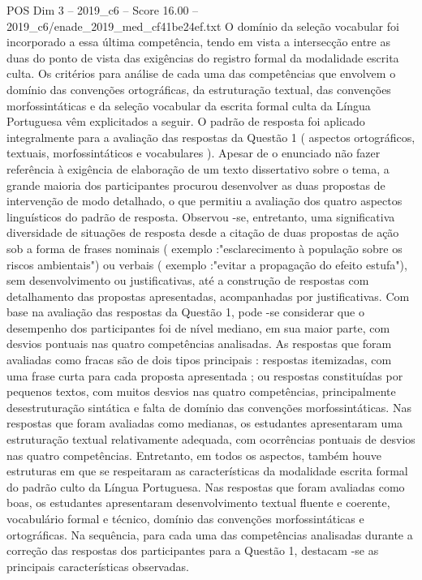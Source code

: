 \begin{textsample}{POS Dim 3 – 2019\_c6 – Score 16.00 – 2019\_c6/enade\_2019\_med\_cf41be24ef.txt}
O domínio da seleção vocabular foi incorporado a essa última competência, tendo em vista a intersecção entre as duas do ponto de vista das exigências do registro formal da modalidade escrita culta.
Os critérios para análise de cada uma das competências que envolvem o domínio das convenções ortográficas, da estruturação textual, das convenções morfossintáticas e da seleção vocabular da escrita formal culta da Língua Portuguesa vêm explicitados a seguir.
O padrão de resposta foi aplicado integralmente para a avaliação das respostas da Questão 1 ( aspectos ortográficos, textuais, morfossintáticos e vocabulares ).
Apesar de o enunciado não fazer referência à exigência de elaboração de um texto dissertativo sobre o tema, a grande maioria dos participantes procurou desenvolver as duas propostas de intervenção de modo detalhado, o que permitiu a avaliação dos quatro aspectos linguísticos do padrão de resposta.
Observou -se, entretanto, uma significativa diversidade de situações de resposta desde a citação de duas propostas de ação sob a forma de frases nominais ( exemplo :"esclarecimento à população sobre os riscos ambientais") ou verbais ( exemplo :"evitar a propagação do efeito estufa"), sem desenvolvimento ou justificativas, até a construção de respostas com detalhamento das propostas apresentadas, acompanhadas por justificativas.
Com base na avaliação das respostas da Questão 1, pode -se considerar que o desempenho dos participantes foi de nível mediano, em sua maior parte, com desvios pontuais nas quatro competências analisadas.
As respostas que foram avaliadas como fracas são de dois tipos principais : respostas itemizadas, com uma frase curta para cada proposta apresentada ; ou respostas constituídas por pequenos textos, com muitos desvios nas quatro competências, principalmente desestruturação sintática e falta de domínio das convenções morfossintáticas.
Nas respostas que foram avaliadas como medianas, os estudantes apresentaram uma estruturação textual relativamente adequada, com ocorrências pontuais de desvios nas quatro competências.
Entretanto, em todos os aspectos, também houve estruturas em que se respeitaram as características da modalidade escrita formal do padrão culto da Língua Portuguesa.
Nas respostas que foram avaliadas como boas, os estudantes apresentaram desenvolvimento textual fluente e coerente, vocabulário formal e técnico, domínio das convenções morfossintáticas e ortográficas.
Na sequência, para cada uma das competências analisadas durante a correção das respostas dos participantes para a Questão 1, destacam -se as principais características observadas.

\end{textsample}
